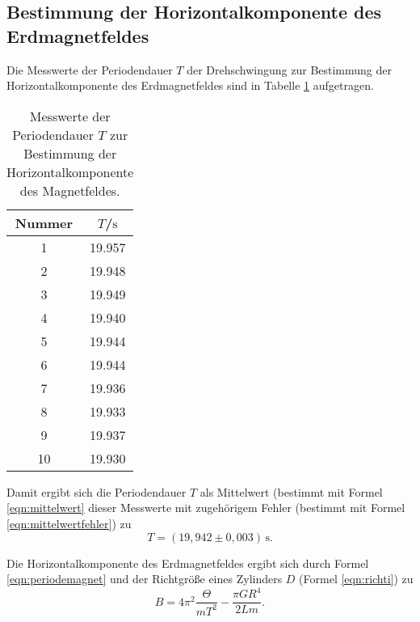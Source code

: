 \FloatBarrier
\subsection{Bestimmung der Horizontalkomponente des Erdmagnetfeldes}

Die Messwerte der Periodendauer $T$ der Drehschwingung zur Bestimmung der Horizontalkomponente
des Erdmagnetfeldes sind in Tabelle \ref{tab:magnetusmaximus} aufgetragen.
\begin{table}
	\caption{Messwerte der Periodendauer $T$ zur Bestimmung der Horizontalkomponente
	des Magnetfeldes.}
	\label{tab:magnetusmaximus}
	\centering
	\begin{tabular}{cc}
		\toprule
		Nummer & $T$/$\si{\second}$ \\
		\midrule
		1      & 19.957             \\
		2      & 19.948             \\
		3      & 19.949             \\
		4      & 19.940             \\
		5      & 19.944             \\
		6      & 19.944             \\
		7      & 19.936             \\
		8      & 19.933             \\
		9      & 19.937             \\
		10     & 19.930             \\
		\bottomrule
	\end{tabular}
\end{table}
Damit ergibt sich die Periodendauer $T$ als Mittelwert (bestimmt mit Formel
\eqref{eqn:mittelwert} dieser Messwerte mit zugehörigem Fehler (bestimmt mit Formel
\eqref{eqn:mittelwertfehler}) zu
\begin{equation*}
	T = (19,942 \pm 0,003) \, \si{\second} \mathrm{.}
\end{equation*}

Die Horizontalkomponente des Erdmagnetfeldes ergibt sich durch Formel \eqref{eqn:periodemagnet}
und der Richtgröße eines Zylinders $D$ (Formel \eqref{eqn:richti}) zu
\begin{equation}
	B = 4\pi^2\frac{\Theta}{m T^2} - \frac{\pi G R^4}{2Lm} \mathrm{.}
\end{equation}
